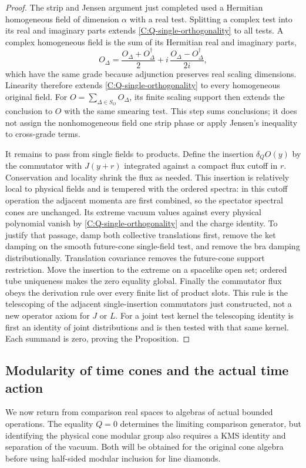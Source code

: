 \begin{proof}
The strip and Jensen argument just completed used a Hermitian
homogeneous field of dimension $\alpha$ with a real test. Splitting a
complex test into its real and imaginary parts extends
\eqref{C:Q-single-orthogonality} to all tests. A complex homogeneous
field is the sum of its Hermitian real and imaginary parts,
\[
 O_\Delta=\frac{O_\Delta+O_\Delta^\dagger}{2}
       +i\,\frac{O_\Delta-O_\Delta^\dagger}{2i},
\]
which have the same grade because adjunction preserves real scaling
dimensions.  Linearity therefore extends
\eqref{C:Q-single-orthogonality} to every homogeneous original field.
For $O=\sum_{\Delta\in S_O}O_\Delta$, its finite scaling support then
extends the conclusion to $O$ with the same smearing test.  This
step sums conclusions; it does not assign the nonhomogeneous field
one strip phase or apply Jensen's inequality to cross-grade terms.

It remains to pass from single fields to products.
Define the insertion $\delta_QO(y)$ by the commutator
with $J(y+r)$ integrated against a compact flux cutoff
in $r$. Conservation and locality shrink the flux as
needed. This insertion is relatively local to physical
fields and is tempered with the ordered spectra: in
this cutoff operation the adjacent momenta are first
combined, so the spectator spectral cones are unchanged.
Its extreme vacuum values against every physical
polynomial vanish by
\eqref{C:Q-single-orthogonality} and the charge identity.
To justify that passage, damp both collective
translations first, remove the ket damping on the
smooth future-cone single-field test, and remove the
bra damping distributionally. Translation covariance
removes the future-cone support restriction. Move the
insertion to the extreme on a spacelike open set;
ordered tube uniqueness makes the zero equality global.
Finally the commutator flux obeys the derivation rule
over every finite list of product slots.  This rule is the
telescoping of the adjacent single-insertion commutators just
constructed, not a new operator axiom for $J$ or $L$.  For a joint
test kernel the telescoping identity is first an identity of joint
distributions and is then tested with that same kernel.  Each
summand is zero, proving the
Proposition.
\end{proof}

\subsection{Modularity of time cones and the actual time action}

We now return from comparison real spaces to algebras of actual
bounded operations.  The equality $Q=0$ determines the limiting
comparison generator, but identifying the physical cone modular
group also requires a KMS identity and separation of the vacuum.
Both will be obtained for the original cone algebra before using
half-sided modular inclusion for line diamonds.

